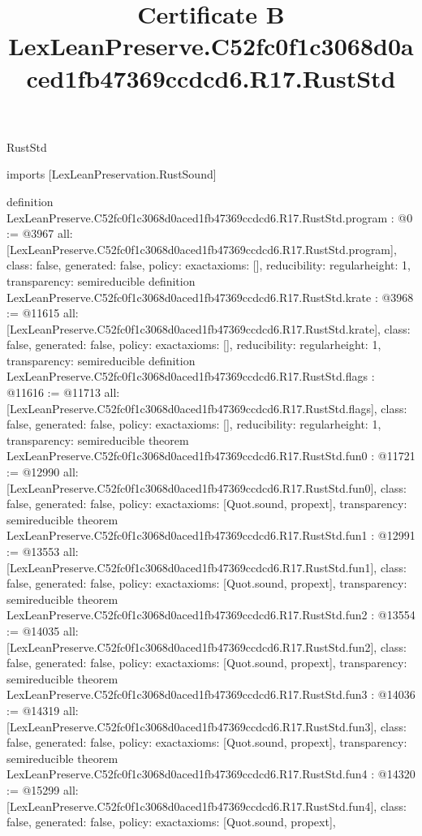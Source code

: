 \begin{lexlean}{RustStd}
\title{Certificate B LexLeanPreserve.C52fc0f1c3068d0aced1fb47369ccdcd6.R17.RustStd}
\begin{coremodule}
imports [LexLeanPreservation.RustSound]

definition LexLeanPreserve.C52fc0f1c3068d0aced1fb47369ccdcd6.R17.RustStd.program : @0 := @3967 {
  all: [LexLeanPreserve.C52fc0f1c3068d0aced1fb47369ccdcd6.R17.RustStd.program],
  class: false,
  generated: false,
  policy: exact{axioms: []},
  reducibility: regular{height: 1},
  transparency: semireducible
}
definition LexLeanPreserve.C52fc0f1c3068d0aced1fb47369ccdcd6.R17.RustStd.krate : @3968 := @11615 {
  all: [LexLeanPreserve.C52fc0f1c3068d0aced1fb47369ccdcd6.R17.RustStd.krate],
  class: false,
  generated: false,
  policy: exact{axioms: []},
  reducibility: regular{height: 1},
  transparency: semireducible
}
definition LexLeanPreserve.C52fc0f1c3068d0aced1fb47369ccdcd6.R17.RustStd.flags : @11616 := @11713 {
  all: [LexLeanPreserve.C52fc0f1c3068d0aced1fb47369ccdcd6.R17.RustStd.flags],
  class: false,
  generated: false,
  policy: exact{axioms: []},
  reducibility: regular{height: 1},
  transparency: semireducible
}
theorem LexLeanPreserve.C52fc0f1c3068d0aced1fb47369ccdcd6.R17.RustStd.fun0 : @11721 := @12990 {
  all: [LexLeanPreserve.C52fc0f1c3068d0aced1fb47369ccdcd6.R17.RustStd.fun0],
  class: false,
  generated: false,
  policy: exact{axioms: [Quot.sound, propext]},
  transparency: semireducible
}
theorem LexLeanPreserve.C52fc0f1c3068d0aced1fb47369ccdcd6.R17.RustStd.fun1 : @12991 := @13553 {
  all: [LexLeanPreserve.C52fc0f1c3068d0aced1fb47369ccdcd6.R17.RustStd.fun1],
  class: false,
  generated: false,
  policy: exact{axioms: [Quot.sound, propext]},
  transparency: semireducible
}
theorem LexLeanPreserve.C52fc0f1c3068d0aced1fb47369ccdcd6.R17.RustStd.fun2 : @13554 := @14035 {
  all: [LexLeanPreserve.C52fc0f1c3068d0aced1fb47369ccdcd6.R17.RustStd.fun2],
  class: false,
  generated: false,
  policy: exact{axioms: [Quot.sound, propext]},
  transparency: semireducible
}
theorem LexLeanPreserve.C52fc0f1c3068d0aced1fb47369ccdcd6.R17.RustStd.fun3 : @14036 := @14319 {
  all: [LexLeanPreserve.C52fc0f1c3068d0aced1fb47369ccdcd6.R17.RustStd.fun3],
  class: false,
  generated: false,
  policy: exact{axioms: [Quot.sound, propext]},
  transparency: semireducible
}
theorem LexLeanPreserve.C52fc0f1c3068d0aced1fb47369ccdcd6.R17.RustStd.fun4 : @14320 := @15299 {
  all: [LexLeanPreserve.C52fc0f1c3068d0aced1fb47369ccdcd6.R17.RustStd.fun4],
  class: false,
  generated: false,
  policy: exact{axioms: [Quot.sound, propext]},
}
\end{coremodule}
\end{lexlean}
